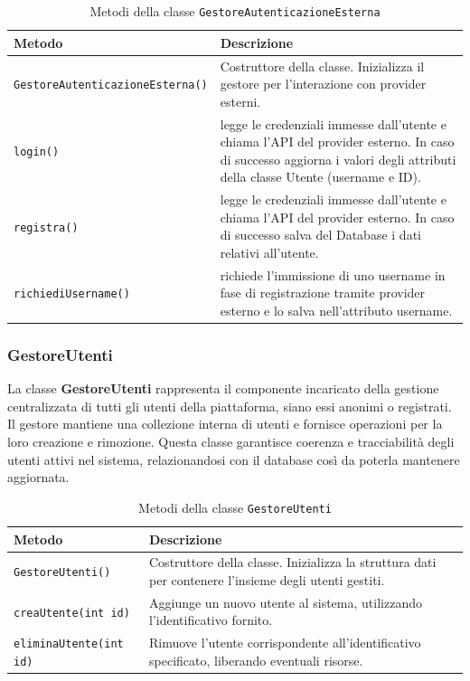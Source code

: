 \begin{table}[H]
\centering
\begin{tabularx}{\textwidth}{|l|X|}
\hline
\textbf{Metodo} & \textbf{Descrizione} \\
\hline
\texttt{GestoreAutenticazioneEsterna()} & Costruttore della classe. Inizializza il gestore per l’interazione con provider esterni. \\
\hline
\texttt{login()} & legge le credenziali immesse dall’utente e chiama l’API del provider
esterno. In caso di successo aggiorna i valori degli attributi della classe
Utente (username e ID). \\
\hline
\texttt{registra()} & legge le credenziali immesse dall’utente e chiama l’API del provider
esterno. In caso di successo salva del Database i dati relativi all’utente. \\
\hline
\texttt{richiediUsername()} & richiede l’immissione di uno username in fase di registrazione tramite
provider esterno e lo salva nell’attributo username. \\
\hline
\end{tabularx}
\caption{Metodi della classe \texttt{GestoreAutenticazioneEsterna}}
\end{table}

\subsubsection{GestoreUtenti}

La classe \textbf{GestoreUtenti} rappresenta il componente incaricato della gestione centralizzata di tutti gli utenti della piattaforma, siano essi anonimi o registrati. Il gestore mantiene una collezione interna di utenti e fornisce operazioni per la loro creazione e rimozione. Questa classe garantisce coerenza e tracciabilità degli utenti attivi nel sistema, relazionandosi con il database così da poterla mantenere aggiornata.

\begin{table}[H]
\centering
\begin{tabularx}{\textwidth}{|l|X|}
\hline
\textbf{Metodo} & \textbf{Descrizione} \\
\hline
\texttt{GestoreUtenti()} & Costruttore della classe. Inizializza la struttura dati per contenere l’insieme degli utenti gestiti. \\
\hline
\texttt{creaUtente(int id)} & Aggiunge un nuovo utente al sistema, utilizzando l’identificativo fornito. \\
\hline
\texttt{eliminaUtente(int id)} & Rimuove l’utente corrispondente all’identificativo specificato, liberando eventuali risorse. \\
\hline
\end{tabularx}
\caption{Metodi della classe \texttt{GestoreUtenti}}
\end{table}

